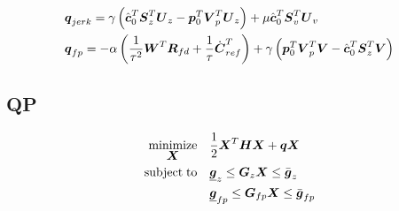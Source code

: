 \begin{equation*}
\begin{split}
& \V{q}_{jerk} = 
    \gamma 
    \left(
        \cstate_0^T \M{S}_z^T \M{U}_z
        - 
        \fp_0^T \M{V}_p^T \M{U}_z 
    \right)
    +
    \mu \cstate_0^T \M{S}_v^T \M{U}_v\\
& \V{q}_{fp} =
    -
    \alpha 
    \left(
        \frac{1}{\tau^2} \V{W}^T \M{R}_{fd}
        +
        \frac{1}{\tau} \cVel_{ref}^T
    \right)
    +
    \gamma 
    \left(
        \fp_0^T \M{V}_p^T \M{V}
        - 
        \cstate_0^T \M{S}_z^T \M{V}
    \right)
\end{split}
\end{equation*}


\subsection{QP}
\begin{equation*}
\begin{split}
    \minimize{\V{X}}    & \frac{1}{2} \V{X}^T\M{H}\V{X} + \V{q} \V{X}\\
    \subjectto          & \underline{\V{g}}_z  \le  \M{G}_z \V{X}  \le  \bar{\V{g}}_z\\
                        & \underline{\V{g}}_{fp}  \le  \M{G}_{fp} \V{X}  \le  \bar{\V{g}}_{fp}
\end{split}
\end{equation*}
